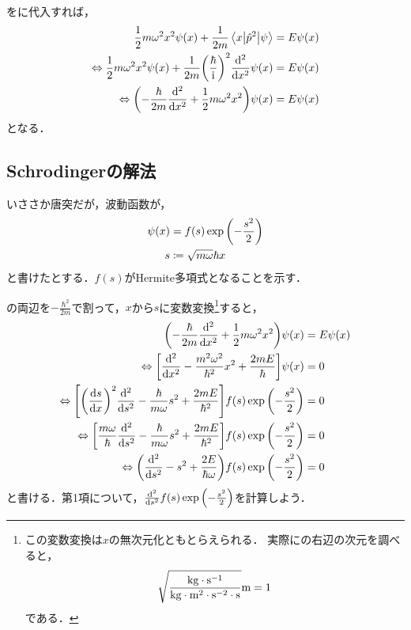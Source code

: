 \documentclass{report}
\begin{document}
    をに代入すれば，
    \begin{align}
      \frac{1}{2}m\omega^2x^2\psi(x) + \frac{1}{2m}\mel**{x}{\hat{p}^2}{\psi} &= E\psi(x) \\ 
      \Leftrightarrow \frac{1}{2}m\omega^2x^2\psi(x) + \frac{1}{2m}\qty(\frac{\hbar}{\mathrm{i}})^2\dv[2]{x}\psi(x) &= E\psi(x) \\ 
      \Leftrightarrow \qty(-\frac{\hbar}{2m}\dv[2]{x} + \frac{1}{2}m\omega^2x^2)\psi(x) &= E\psi(x)\label{schrodinger-eq-wave-func}
    \end{align}
    となる．
  \subsection{Schrodingerの解法}
    いささか唐突だが，波動函数が，
    \begin{align}
      \psi(x) &= f(s)\exp\qty(-\frac{s^2}{2}) \label{psi-fs}\\ 
      s &\coloneqq \sqrt{m\omega}{\hbar}x\label{s-def}
    \end{align}
    と書けたとする．$f(s)$がHermite多項式となることを示す．
    \par
    の両辺を$-\frac{\hbar^2}{2m}$で割って，$x$から$s$に変数変換\footnote{
      この変数変換は$x$の無次元化ともとらえられる．
      実際にの右辺の次元を調べると，
      \begin{align*}
        \sqrt{\frac{\mathrm{kg\cdot s^{-1}}}{\mathrm{kg\cdot m^2\cdot s^{-2}\cdot s}}}\mathrm{m} = 1
      \end{align*}
      である．
    }すると，
    \begin{align}
      \qty(-\frac{\hbar}{2m}\dv[2]{x} + \frac{1}{2}m\omega^2x^2)\psi(x) &= E\psi(x) \\ 
      \Leftrightarrow \qty[\dv[2]{x} - \frac{m^2\omega^2}{\hbar^2}x^2 + \frac{2mE}{\hbar}]\psi(x) &= 0 \\ 
      \Leftrightarrow \qty[\qty(\dv{s}{x})^2\dv[2]{s} - \frac{\hbar}{m\omega}s^2 + \frac{2mE}{\hbar^2}]f(s)\exp\qty(-\frac{s^2}{2}) &= 0 \\ 
      \Leftrightarrow \qty[\frac{m\omega}{\hbar}\dv[2]{s} - \frac{\hbar}{m\omega}s^2 + \frac{2mE}{\hbar^2}]f(s)\exp\qty(-\frac{s^2}{2}) &= 0 \\ 
      \Leftrightarrow \qty(\dv[2]{s} - s^2 + \frac{2E}{\hbar\omega})f(s)\exp\qty(-\frac{s^2}{2}) &= 0 \label{before-hermite-polynominal}
    \end{align}
    と書ける．第1項について，$\dv[2]{s}f(s)\exp\qty(-\frac{s^2}{2})$を計算しよう．
\end{document}
